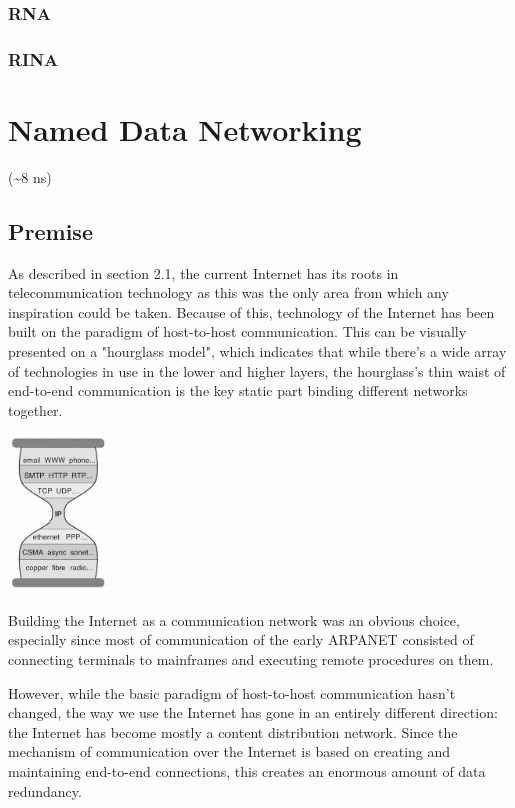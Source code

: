         \subsection{RNA}
        \subsection{RINA}

\chapter{Named Data Networking}
    (\textasciitilde8 ns)
    \section{Premise}
        As described in section 2.1, the current Internet has its roots in telecommunication technology as this was the only area from which any inspiration could be taken. Because of this, technology of the Internet has been built on the paradigm of host-to-host communication. This can be visually presented on a "hourglass model", which indicates that while there's a wide array of technologies in use in the lower and higher layers, the hourglass's thin waist of end-to-end communication is the key static part binding different networks together.

        \begin{center}\includegraphics[width=0.2\textwidth]{media/ndn_hourglass1.jpg}\end{center}

        Building the Internet as a communication network was an obvious choice, especially since most of communication of the early ARPANET consisted of connecting terminals to mainframes and executing remote procedures on them.

        However, while the basic paradigm of host-to-host communication hasn't changed, the way we use the Internet has gone in an entirely different direction: the Internet has become mostly a content distribution network. Since the mechanism of communication over the Internet is based on creating and maintaining end-to-end connections, this creates an enormous amount of data redundancy.

